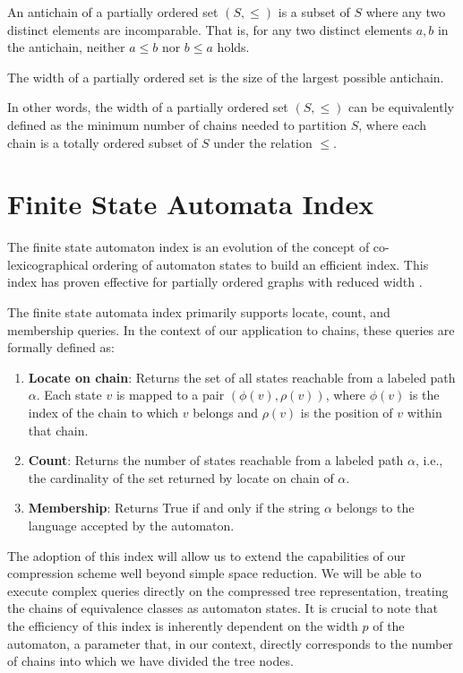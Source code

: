 \begin{definition}[Antichain]
    An antichain of a partially ordered set $(S, \leq)$ is a subset of $S$ where any two distinct elements are incomparable. That is, for any two distinct elements $a, b$ in the antichain, neither $a \leq b$ nor $b \leq a$ holds.
\end{definition}

\begin{definition}[Width]
    The width of a partially ordered set is the size of the largest possible antichain.
\end{definition}
In other words, the width of a partially ordered set $(S, \leq)$ can be equivalently defined as the minimum number of chains needed to partition $S$, where each chain is a totally ordered subset of $S$ under the relation $\leq$.

\section{Finite State Automata Index}
The finite state automaton index is an evolution of the concept of co-lexicographical ordering of automaton states to build an efficient index. This index has proven effective for partially ordered graphs with reduced width \cite{cotumaccio2023co}.

The finite state automata index primarily supports locate, count, and membership queries. In the context of our application to chains, these queries are formally defined as:

\begin{enumerate}
    \item \textbf{Locate on chain}: Returns the set of all states reachable from a labeled path $\alpha$. Each state $v$ is mapped to a pair $(\phi(v), \rho(v))$, where $\phi(v)$ is the index of the chain to which $v$ belongs and $\rho(v)$ is the position of $v$ within that chain.
    \item \textbf{Count}: Returns the number of states reachable from a labeled path $\alpha$, i.e., the cardinality of the set returned by locate on chain of $\alpha$.
    \item \textbf{Membership}: Returns True if and only if the string $\alpha$ belongs to the language accepted by the automaton.
\end{enumerate}

The adoption of this index will allow us to extend the capabilities of our compression scheme well beyond simple space reduction. We will be able to execute complex queries directly on the compressed tree representation, treating the chains of equivalence classes as automaton states. It is crucial to note that the efficiency of this index is inherently dependent on the width $p$ of the automaton, a parameter that, in our context, directly corresponds to the number of chains into which we have divided the tree nodes.

